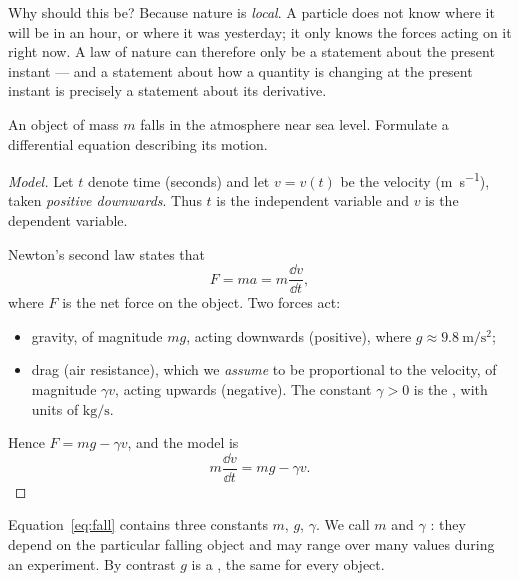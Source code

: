 \begin{intuition}
	Why should this be? Because nature is \emph{local}. A particle does not know where it
	will be in an hour, or where it was yesterday; it only knows the forces acting on it
	right now. A law of nature can therefore only be a statement about the present
	instant --- and a statement about how a quantity is changing at the present instant is
	precisely a statement about its derivative.
\end{intuition}

\begin{eg}\label{eg:fall}
	An object of mass \(m\) falls in the atmosphere near sea level. Formulate a
	differential equation describing its motion.
\end{eg}

\begin{proof}[Model]
	Let \(t\) denote time (seconds) and let \(v = v(t)\) be the velocity
	(\si{\metre\per\second}), taken \emph{positive downwards}. Thus \(t\) is the
	independent variable and \(v\) is the dependent variable.

	Newton's second law states that
	\[
		F = ma = m\frac{\dd v}{\dd t},
	\]
	where \(F\) is the net force on the object. Two forces act:
	\begin{itemize}
		\item gravity, of magnitude \(mg\), acting downwards (positive), where
		      \(g \approx \SI{9.8}{\metre\per\second\squared}\);
		\item drag (air resistance), which we \emph{assume} to be proportional to the
		      velocity, of magnitude \(\gamma v\), acting upwards (negative). The constant
		      \(\gamma > 0\) is the , with units of
		      \(\si{\kilogram\per\second}\).
	\end{itemize}
	Hence \(F = mg - \gamma v\), and the model is
	\begin{equation}\label{eq:fall}
		m \frac{\dd v}{\dd t} = mg - \gamma v.
	\end{equation}
\end{proof}

\begin{note}
	Equation~\eqref{eq:fall} contains three constants \(m\), \(g\), \(\gamma\). We call
	\(m\) and \(\gamma\) : they depend on the particular falling object
	and may range over many values during an experiment. By contrast \(g\) is a
	, the same for every object.
\end{note}

